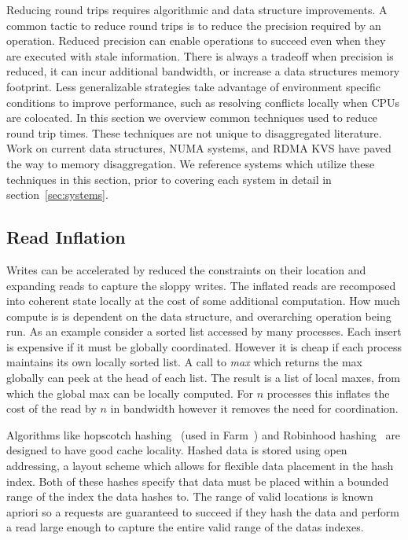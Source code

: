 Reducing round trips requires algorithmic and data structure improvements. A
common tactic to reduce round trips is to reduce the precision required by an
operation. Reduced precision can enable operations to succeed even when they are
executed with stale information. There is always a tradeoff when precision is
reduced, it can incur additional bandwidth, or increase a data structures memory
footprint. Less generalizable strategies take advantage of environment specific
conditions to improve performance, such as resolving conflicts locally when CPUs
are colocated. In this section we overview common techniques used to reduce
round trip times. These techniques are not unique to disaggregated literature.
Work on current data structures, NUMA systems, and RDMA KVS have paved the way
to memory disaggregation. We reference systems which utilize these techniques in
this section, prior to covering each system in detail in
section~\ref{sec:systems}.


\subsection{Read Inflation} \label{sec:readsize}
Writes can be accelerated by reduced the constraints on their location and
expanding reads to capture the sloppy writes. The inflated reads are recomposed
into coherent state locally at the cost of some additional computation. How much
compute is is dependent on the data structure, and overarching operation being
run. As an example consider a sorted list accessed by many processes. Each
insert is expensive if it must be globally coordinated. However it is cheap if
each process maintains its own locally sorted list. A call to \textit{max} which
returns the max globally can peek at the head of each list. The result is a list
of local maxes, from which the global max can be locally computed.  For $n$
processes this inflates the cost of the read by $n$ in bandwidth however it
removes the need for coordination. 

Algorithms like hopscotch hashing~\cite{hopscotch} (used in Farm~\cite{farm})
and Robinhood hashing~\cite{robinhood} are designed to have good cache locality.
Hashed data is stored using open addressing, a layout scheme which allows for
flexible data placement in the hash index.  Both of these hashes specify that
data must be placed within a bounded range of the index the data hashes to. The
range of valid locations is known apriori so a requests are guaranteed to
succeed if they hash the data and perform a read large enough to capture the
entire valid range of the datas indexes.

